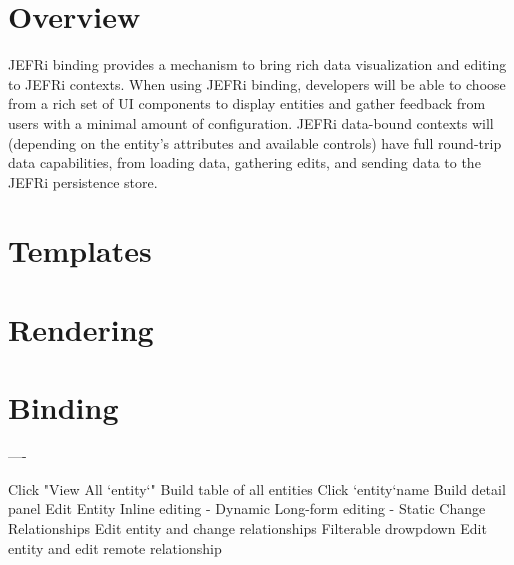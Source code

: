 \documentclass{article}
\begin{document}
\maketitle
\tableofcontents
\newpage

\section{Overview}
JEFRi binding provides a mechanism to bring rich data visualization and editing
to JEFRi contexts. When using JEFRi binding, developers will be able to choose
from a rich set of UI components to display entities and gather feedback from
users with a minimal amount of configuration. JEFRi data-bound contexts will
(depending on the entity's attributes and available controls) have full
round-trip data capabilities, from loading data, gathering edits, and sending
data to the JEFRi persistence store.

\section{Templates}

\section{Rendering}

\section{Binding}

----

Click "View All `entity`"
	Build table of all entities
Click `entity`name
	Build detail panel
Edit Entity
	Inline editing - Dynamic
	Long-form editing - Static
Change Relationships
	Edit entity and change relationships
		Filterable drowpdown
	Edit entity and edit remote relationship
\end{document}
